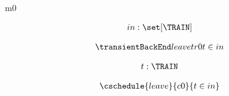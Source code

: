 \documentclass[12pt]{amsart}
\title{}
\author{}
\date{} %
\begin{document}
\maketitle
\tableofcontents


\begin{machine}{m0}


%
	\begin{align*}
	\variable{	in : \set[\TRAIN]}
	\end{align*}
%


\begin{align*}
\transient{leave}{tr0}
{	t \in in	}
\end{align*}

\begin{align*}
\dummy{	t : \TRAIN}
\end{align*}

\begin{align*}
\cschedule{leave}{c0}
{	t \in in	}
\end{align*}

\end{machine}
\end{document}
